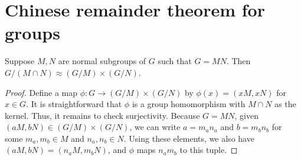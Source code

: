 \section{Chinese remainder theorem for groups}

\begin{thm}
    Suppose $M, N$ are normal subgroups of $G$ such that $G=MN$.
    Then $G/(M\cap N)\approx (G/M)\times(G/N)$.
\end{thm}
\begin{proof}
    Define a map $\phi: G\rightarrow (G/M)\times(G/N)$ by $\phi(x)=(xM, xN)$ for $x\in G$.
    It is straightforward that $\phi$ is a group homomorphism with $M\cap N$ as the kernel.
    Thus, it remains to check surjectivity.
    Because $G=MN$, given $(aM, bN)\in(G/M)\times(G/N)$, we can write $a=m_an_a$ and $b=m_bn_b$ for some $m_a, m_b\in M$ and $n_a, n_b\in N$.
    Using these elements, we also have $(aM, bN)=(n_aM, m_bN)$, and $\phi$ maps $n_am_b$ to this tuple.
\end{proof}